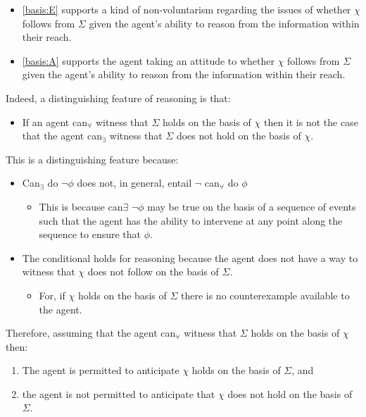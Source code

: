 \documentclass[10pt]{article}
\newcommand{\hozlinedash}[0]{%
  \noindent\hdashrule[0.5ex][c]{\textwidth}{.1pt}{2.5pt}
}
\begin{document}
\begin{itemize}
\item \ref{basis:E} supports a kind of non-voluntarism regarding the issues of whether \(\chi\) follows from \(\Sigma\) given the agent's ability to reason from the information within their reach.
\item \ref{basis:A} supports the agent taking an attitude to whether \(\chi\) follows from \(\Sigma\) given the agent's ability to reason from the information within their reach.
\end{itemize}

\hozlinedash

Indeed, a distinguishing feature of reasoning is that:

\begin{itemize}
\item If an agent can\(_{\forall}\) witness that \(\Sigma\) holds on the basis of \(\chi\) then it is not the case that the agent can\(_{\exists}\) witness that \(\Sigma\) does not hold on the basis of \(\chi\).
\end{itemize}

This is a distinguishing feature because:

\begin{itemize}
\item Can\(_{\exists}\) do \(\lnot\phi\) does not, in general, entail \(\lnot\) can\(_{\forall}\) do \(\phi\)
  \begin{itemize}
  \item This is because can\(\exists\) \(\lnot\phi\) may be true on the basis of a sequence of events such that the agent has the ability to intervene at any point along the sequence to ensure that \(\phi\).
  \end{itemize}
\item The conditional holds for reasoning because the agent does not have a way to witness that \(\chi\) does not follow on the basis of \(\Sigma\).
  \begin{itemize}
  \item For, if \(\chi\) holds on the basis of \(\Sigma\) there is no counterexample available to the agent.
  \end{itemize}
\end{itemize}

\hozlinedash

Therefore, assuming that the agent can\(_{\forall}\) witness that \(\Sigma\) holds on the basis of \(\chi\) then:
\begin{enumerate}
\item The agent is permitted to anticipate \(\chi\) holds on the basis of \(\Sigma\), and
\item the agent is not permitted to anticipate that \(\chi\) does not hold on the basis of \(\Sigma\).
\end{enumerate}
\end{document}
